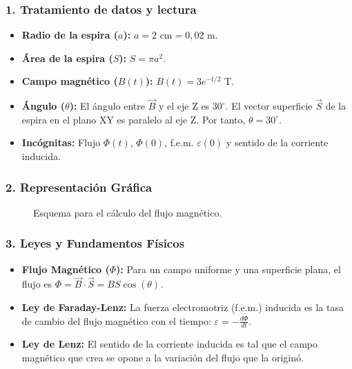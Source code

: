 \subsubsection*{1. Tratamiento de datos y lectura}
\begin{itemize}
    \item \textbf{Radio de la espira ($a$):} $a = 2 \text{ cm} = 0,02 \text{ m}$.
    \item \textbf{Área de la espira ($S$):} $S = \pi a^2$.
    \item \textbf{Campo magnético ($B(t)$):} $B(t) = 3e^{-t/2}$ T.
    \item \textbf{Ángulo ($\theta$):} El ángulo entre $\vec{B}$ y el eje Z es $30^\circ$. El vector superficie $\vec{S}$ de la espira en el plano XY es paralelo al eje Z. Por tanto, $\theta = 30^\circ$.
    \item \textbf{Incógnitas:} Flujo $\Phi(t)$, $\Phi(0)$, f.e.m. $\varepsilon(0)$ y sentido de la corriente inducida.
\end{itemize}

\subsubsection*{2. Representación Gráfica}
\begin{figure}[H]
    \centering
    \caption{Esquema para el cálculo del flujo magnético.}
\end{figure}

\subsubsection*{3. Leyes y Fundamentos Físicos}
\begin{itemize}
    \item \textbf{Flujo Magnético ($\Phi$):} Para un campo uniforme y una superficie plana, el flujo es $\Phi = \vec{B} \cdot \vec{S} = B S \cos(\theta)$.
    \item \textbf{Ley de Faraday-Lenz:} La fuerza electromotriz (f.e.m.) inducida es la tasa de cambio del flujo magnético con el tiempo: $\varepsilon = -\frac{d\Phi}{dt}$.
    \item \textbf{Ley de Lenz:} El sentido de la corriente inducida es tal que el campo magnético que crea se opone a la variación del flujo que la originó.
\end{itemize}

